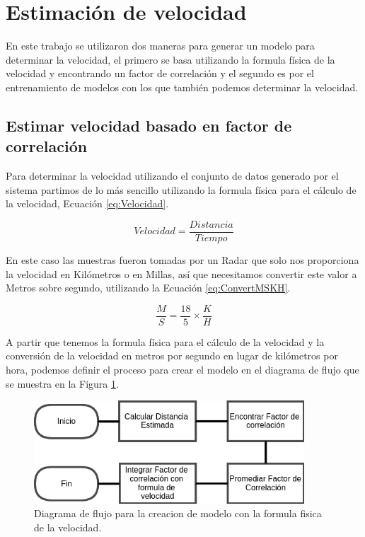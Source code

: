 \section{Estimación de velocidad}
\label{cap:EstimacionVelocidad}

En este trabajo se utilizaron dos maneras para generar un modelo para determinar la velocidad, el primero se basa utilizando la formula física de la velocidad y encontrando un factor de correlación y el segundo es por el entrenamiento de modelos con los que también podemos determinar la velocidad.

\subsection{Estimar velocidad basado en factor de correlación}

Para determinar la velocidad utilizando el conjunto de datos generado por el sistema partimos de lo más sencillo utilizando la formula física para el cálculo de la velocidad, Ecuación \ref{eq:Velocidad}.

\begin{equation}
    \label{eq:Velocidad}
    Velocidad = \frac{Distancia}{Tiempo}
\end{equation}

En este caso las muestras fueron tomadas por un Radar que solo nos proporciona la velocidad en Kilómetros o en Millas, así que necesitamos convertir este valor a Metros sobre segundo, utilizando la Ecuación \ref{eq:ConvertMSKH}.

\begin{equation}
    \label{eq:ConvertMSKH}
    \frac{M}{S} = \frac{18}{5} \times \frac{K}{H}
\end{equation}

A partir que tenemos la formula física para el cálculo de la velocidad y la conversión de la velocidad en metros por segundo en lugar de kilómetros por hora, podemos definir el proceso para crear el modelo en el diagrama de flujo que se muestra en la Figura \ref{fig:CrearModeloCustom}.

\begin{figure}[H]
    \centering
    \includegraphics[width=0.9\textwidth]{Metodologia/imgs/CrearModeloCustom.png}
    \caption{Diagrama de flujo para la creacion de modelo con la formula fisica de la velocidad.}
    \label{fig:CrearModeloCustom}
\end{figure}


